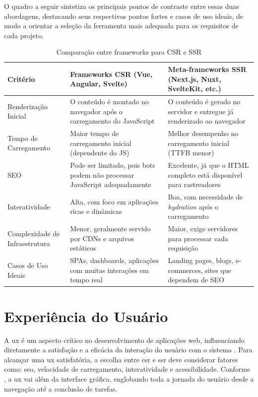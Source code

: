O quadro a seguir sintetiza os principais pontos de contraste entre essas duas abordagens, destacando seus respectivos pontos fortes e casos de uso ideais, de modo a orientar a seleção da ferramenta mais adequada para os requisitos de cada projeto.

\begin{table}[H]
\centering
\caption{Comparação entre frameworks para CSR e SSR}
\label{tab:comparativo-frameworks}
\begin{tabular}{|p{3cm}|p{5.5cm}|p{5.5cm}|}
\hline
Critério & Frameworks CSR (Vue, Angular, Svelte) & Meta-frameworks SSR (Next.js, Nuxt, SvelteKit, etc.) \\
\hline
Renderização Inicial & O conteúdo é montado no navegador após o carregamento do JavaScript & O conteúdo é gerado no servidor e entregue já renderizado ao navegador \\
\hline
Tempo de Carregamento & Maior tempo de carregamento inicial (dependente do JS) & Melhor desempenho no carregamento inicial (TTFB menor) \\
\hline
SEO & Pode ser limitado, pois bots podem não processar JavaScript adequadamente & Excelente, já que o HTML completo está disponível para rastreadores \\
\hline
Interatividade & Alta, com foco em aplicações ricas e dinâmicas & Boa, com necessidade de \textit{hydration} após o carregamento \\
\hline
Complexidade de Infraestrutura & Menor, geralmente servido por CDNs e arquivos estáticos & Maior, exige servidores para processar cada requisição \\
\hline
Casos de Uso Ideais & SPAs, dashboards, aplicações com muitas interações em tempo real & Landing pages, blogs, e-commerces, sites que dependem de SEO \\
\hline
\end{tabular}
\end{table}


\section{Experiência do Usuário}
\label{sec:ux}
A \acrfull{ux} é um aspecto crítico no desenvolvimento de aplicações web, influenciando diretamente a satisfação e a eficácia da interação do usuário com o sistema \cite{atori2023}. Para alcançar uma \acrshort{ux} satisfatória, a escolha entre \acrshort{csr} e \acrshort{ssr} deve considerar fatores como: {\acrshort{seo}}, velocidade de carregamento, interatividade e acessibilidade.
Conforme , a \acrshort{ux} vai além da interface gráfica, englobando toda a jornada do usuário desde a navegação até a conclusão de tarefas. 

